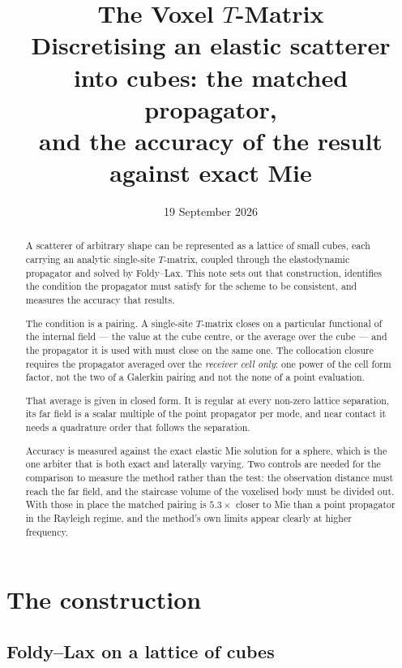 \documentclass[11pt,a4paper]{article}
\title{\bfseries The Voxel \texorpdfstring{$T$}{T}-Matrix\\[4pt]
\large Discretising an elastic scatterer into cubes: the matched propagator,\\
and the accuracy of the result against exact Mie}
\author{}
\date{19 September 2026}
\begin{document}
\maketitle

\begin{abstract}
\noindent
A scatterer of arbitrary shape can be represented as a lattice of small cubes,
each carrying an analytic single-site $T$-matrix, coupled through the
elastodynamic propagator and solved by Foldy--Lax.  This note sets out that
construction, identifies the condition the propagator must satisfy for the
scheme to be consistent, and measures the accuracy that results.

The condition is a pairing.  A single-site $T$-matrix closes on a particular
functional of the internal field --- the value at the cube centre, or the
average over the cube --- and the propagator it is used with must close on the
same one.  The collocation closure requires the propagator averaged over the
\emph{receiver cell only}: one power of the cell form factor, not the two of a
Galerkin pairing and not the none of a point evaluation.

That average is given in closed form.  It is regular at every non-zero lattice
separation, its far field is a scalar multiple of the point propagator per
mode, and near contact it needs a quadrature order that follows the separation.

Accuracy is measured against the exact elastic Mie solution for a sphere, which
is the one arbiter that is both exact and laterally varying.  Two controls are
needed for the comparison to measure the method rather than the test: the
observation distance must reach the far field, and the staircase volume of the
voxelised body must be divided out.  With those in place the matched pairing is
$5.3\times$ closer to Mie than a point propagator in the Rayleigh regime, and
the method's own limits appear clearly at higher frequency.
\end{abstract}

\tableofcontents

\section{The construction}\label{sec:construction}

\subsection{Foldy--Lax on a lattice of cubes}
\end{document}
